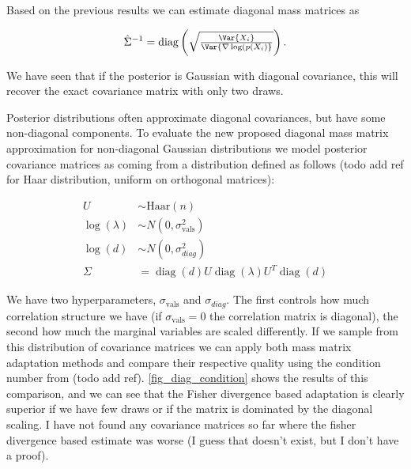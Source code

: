\documentclass{scrartcl}
\DeclareMathOperator{\diag}{diag}
\begin{document}
Based on the previous results we can estimate diagonal mass matrices as

\[
\hat\Sigma^{-1} = \diag\left(\sqrt{\tfrac{\Var{X_i}}{\Var{\nabla \log(p(X_i)}}}\right).
\]

We have seen that if the posterior is Gaussian with diagonal covariance,
this will recover the exact covariance matrix with only two draws.

Posterior distributions often approximate diagonal covariances, but
have some non-diagonal components. To evaluate the new proposed diagonal
mass matrix approximation for non-diagonal Gaussian distributions 
we model posterior covariance matrices as coming from a distribution
defined as follows (todo add ref for Haar distribution, uniform on orthogonal matrices):

\begin{align*}
U &\sim \text{Haar}(n) \\
\log(\lambda) &\sim N(0, \sigma_\text{vals}^2) \\
\log(d) &\sim N(0, \sigma_{diag}^2) \\
\Sigma &= \diag(d)U\diag(\lambda)U^T\diag(d)
\end{align*}

We have two hyperparameters, $\sigma_\text{vals}$ and $\sigma_{diag}$. The
first controls how much correlation structure we have (if $\sigma_\text{vals} =
0$ the correlation matrix is diagonal), the second how much the marginal
variables are scaled differently. If we sample from this distribution of
covariance matrices we can apply both mass matrix adaptation methods and
compare their respective quality using the condition number from (todo add
ref). \autoref{fig_diag_condition} shows the results of this comparison, and we
can see that the Fisher divergence based adaptation is clearly superior if we
have few draws or if the matrix is dominated by the diagonal scaling. I have
not found any covariance matrices so far where the fisher divergence based
estimate was worse (I guess that doesn't exist, but I don't have a proof).
\end{document}
